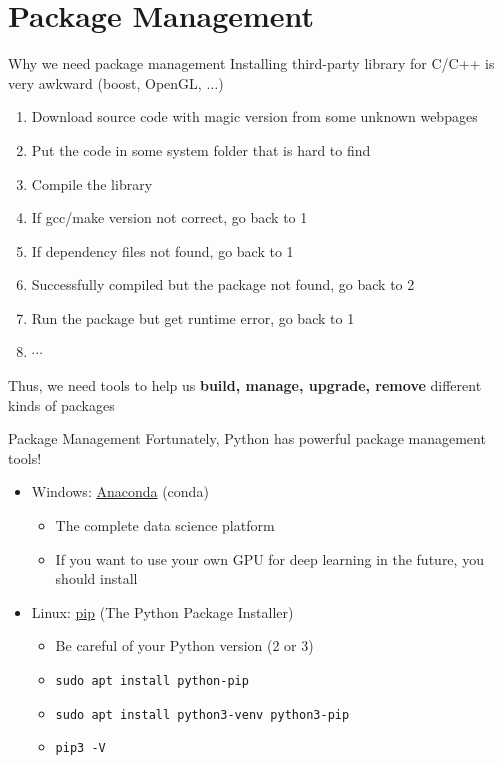 \documentclass{../TexTemplate/myslide}
\begin{document}
\section{Package Management}
\begin{frame}
\sectionpage
\end{frame}

\begin{frame}{Why we need package management}
Installing third-party library for C/C++ is very awkward (boost, OpenGL, $\ldots$)
\begin{enumerate}
	\item Download source code with magic version from some unknown webpages
	\item Put the code in some system folder that is hard to find
	\item Compile the library
	\item If gcc/make version not correct, go back to 1
	\item If dependency files not found, go back to 1
	\item Successfully compiled but the package not found, go back to 2
	\item Run the package but get runtime error, go back to 1
	\item $\cdots$
\end{enumerate}
\pause
Thus, we need tools to help us \textbf{build, manage, upgrade, remove} different kinds of packages
\end{frame}

\begin{frame}[fragile]{Package Management}
Fortunately, Python has powerful package management tools!
\begin{itemize}
	\item Windows: \href{https://www.anaconda.com/}{Anaconda} (conda)
	\begin{itemize}
		\item The complete data science platform
		\item If you want to use your own GPU for deep learning in the future, you should install
	\end{itemize}
	\item Linux: \href{https://pip.pypa.io/en/stable/}{pip} (The Python Package Installer)
	\begin{itemize}
		\item Be careful of your Python version (2 or 3)
		\item \verb'sudo apt install python-pip'
		\item \verb'sudo apt install python3-venv python3-pip'
		\item \verb'pip3 -V'
	\end{itemize}
\end{itemize}
\end{frame}
\end{document}
